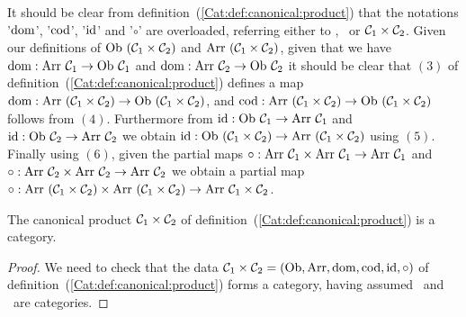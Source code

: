It should be clear from definition~(\ref{Cat:def:canonical:product}) that
the notations '$\mbox{\rm dom}$', '$\mbox{\rm cod}$', '$\mbox{\rm id}$' and '$\circ$' are overloaded, 
referring either to \Cone, \Ctwo\ or $\mbox{${\cal C}_{1}$}\times\mbox{${\cal C}_{2}$}$. Given our definitions 
of $\mbox{\rm Ob}\ (\mbox{${\cal C}_{1}$}\times\mbox{${\cal C}_{2}$})$ and $\mbox{\rm Arr}\ (\mbox{${\cal C}_{1}$}\times\mbox{${\cal C}_{2}$})$, given that we 
have $\mbox{\rm dom}:\mbox{\rm Arr}\ \mbox{${\cal C}_{1}$}\to\mbox{\rm Ob}\ \mbox{${\cal C}_{1}$}$ and $\mbox{\rm dom}:\mbox{\rm Arr}\ \mbox{${\cal C}_{2}$}\to\mbox{\rm Ob}\ \mbox{${\cal C}_{2}$}$ it 
should be clear that $(3)$ of definition~(\ref{Cat:def:canonical:product})
defines a map $\dom:\arr\ (\Cone\times\Ctwo)\to\ob\ (\Cone\times\Ctwo)$,
and $\cod:\arr\ (\Cone\times\Ctwo)\to\ob\ (\Cone\times\Ctwo)$
follows from $(4)$. Furthermore from $\id:\ob\ \Cone\to\arr\ \Cone$
and $\id:\ob\ \Ctwo\to\arr\ \Ctwo$ we obtain $\id:\ob\ (\Cone\times\Ctwo)
\to\arr\ (\Cone\times\Ctwo)$ using $(5)$. Finally using $(6)$, given 
the partial maps $\circ:\arr\ \Cone\times\arr\ \Cone\to\arr\ \Cone$
and $\circ:\arr\ \Ctwo\times\arr\ \Ctwo\to\arr\ \Ctwo$ we obtain
a partial map $\circ:\mbox{\rm Arr}\ (\mbox{${\cal C}_{1}$}\times\mbox{${\cal C}_{2}$})\times\mbox{\rm Arr}
\ (\mbox{${\cal C}_{1}$}\times\mbox{${\cal C}_{2}$})\to\mbox{\rm Arr}\ \mbox{${\cal C}_{1}$}\times\mbox{${\cal C}_{2}$}$.

\begin{prop}\label{Cat:prop:canonical:product:is:category}
    The canonical product $\mbox{${\cal C}_{1}$}\times\mbox{${\cal C}_{2}$}$ of 
    definition~(\ref{Cat:def:canonical:product}) is a category.
\end{prop}
\begin{proof}
    We need to check that the data $\mbox{${\cal C}_{1}$}\times\mbox{${\cal C}_{2}$}=(\mbox{\rm Ob}, \mbox{\rm Arr}, \mbox{\rm dom}, 
    \mbox{\rm cod}, \mbox{\rm id}, \circ)$ of definition~(\ref{Cat:def:canonical:product})
    forms a category, having assumed \Cone\ and \Ctwo\ are categories.
\end{proof}
